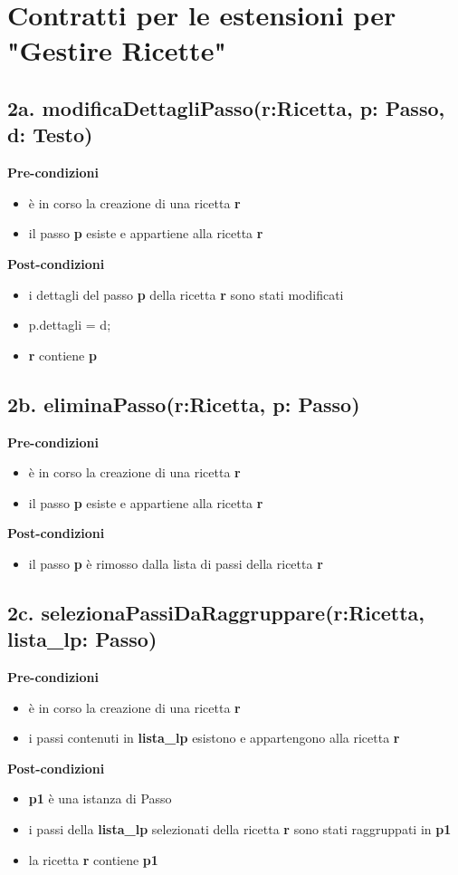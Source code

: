 \documentclass[12pt]{extarticle}
\begin{document}
\section*{Contratti per le estensioni per "Gestire Ricette"}

\subsection*{2a. modificaDettagliPasso(r:Ricetta, p: Passo, d: Testo)}

\textbf{Pre-condizioni}
\begin{itemize}
  \item è in corso la creazione di una ricetta  \textbf{r}
  \item il passo  \textbf{p} esiste e appartiene alla ricetta \textbf{r}
\end{itemize}
\textbf{Post-condizioni}
\begin{itemize}
  \item i dettagli del passo \textbf{p} della ricetta \textbf{r} sono stati modificati
  \item p.dettagli = d;
  \item  \textbf{r} contiene  \textbf{p}
\end{itemize}

\subsection*{2b. eliminaPasso(r:Ricetta, p: Passo)}

\textbf{Pre-condizioni}
\begin{itemize}
  \item è in corso la creazione di una ricetta  \textbf{r}
  \item il passo  \textbf{p} esiste e appartiene alla ricetta \textbf{r}
\end{itemize}
\textbf{Post-condizioni}
\begin{itemize}
  \item il passo  \textbf{p} è rimosso dalla lista di passi della ricetta \textbf{r}
\end{itemize}

\subsection*{2c. selezionaPassiDaRaggruppare(r:Ricetta, lista\_lp: Passo)}

\textbf{Pre-condizioni}
\begin{itemize}
  \item è in corso la creazione di una ricetta  \textbf{r}
  \item i passi contenuti in \textbf{lista\_lp} esistono e appartengono alla ricetta \textbf{r}
\end{itemize}
\textbf{Post-condizioni}
\begin{itemize}
  \item \textbf{p1} è una istanza di Passo
  \item i passi della \textbf{lista\_lp} selezionati della ricetta  \textbf{r} sono stati raggruppati in \textbf{p1}
  \item  la ricetta \textbf{r} contiene  \textbf{p1}
\end{itemize}
\end{document}
